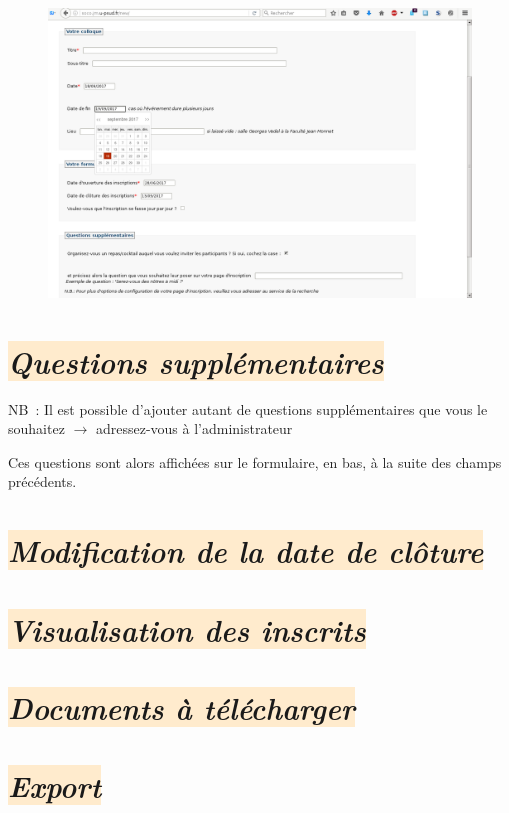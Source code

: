 \documentclass[10pt,a4paper]{article}
\newcommand{\rosepale}[1]{\colorbox{BlanchedAlmond}{#1}}
\begin{document}
\begin{figure}[h]
  \includegraphics[width=500px]{images/creation-formulaire}
\end{figure}

\section*{\rosepale{\emph{Questions supplémentaires}}}

NB : Il est possible d'ajouter autant de questions supplémentaires que vous le souhaitez $\longrightarrow$ adressez-vous à l'administrateur

Ces questions sont alors affichées sur le formulaire, en bas, à la suite des champs précédents.

\newpage
\section*{\rosepale{\emph{Modification de la date de clôture}}}

\section*{\rosepale{\emph{Visualisation des inscrits}}}

\section*{\rosepale{\emph{Documents à télécharger}}}

\section*{\rosepale{\emph{Export}}}
\end{document}
